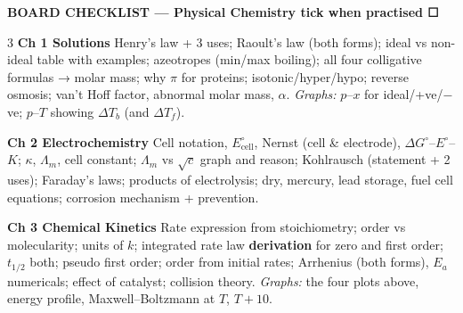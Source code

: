\documentclass[9pt,a4paper]{extarticle}
\begin{document}
\begin{tcolorbox}[enhanced,colback=navy,colframe=navy,arc=2pt,left=6pt,right=6pt,top=2pt,bottom=2pt,before skip=4pt]
\color{white}\sffamily\bfseries\small BOARD CHECKLIST — Physical Chemistry \hfill\footnotesize\mdseries tick when practised ☐
\end{tcolorbox}
\begin{multicols}{3}\raggedcolumns
\scriptsize
\textbf{\textcolor{uI}{Ch 1 Solutions}} Henry's law + 3 uses; Raoult's law (both forms); ideal vs non-ideal table with examples; azeotropes (min/max boiling); all four colligative formulas → molar mass; why $\pi$ for proteins; isotonic/hyper/hypo; reverse osmosis; van't Hoff factor, abnormal molar mass, $\alpha$. \emph{Graphs:} $p$--$x$ for ideal/+ve/$-$ve; $p$--$T$ showing $\Delta T_b$ (and $\Delta T_f$).

\textbf{\textcolor{uII}{Ch 2 Electrochemistry}} Cell notation, $E^\circ_\text{cell}$, Nernst (cell \& electrode), $\Delta G^\circ$--$E^\circ$--$K$; $\kappa$, $\Lambda_m$, cell constant; $\Lambda_m$ vs $\sqrt c$ graph and reason; Kohlrausch (statement + 2 uses); Faraday's laws; products of electrolysis; dry, mercury, lead storage, fuel cell equations; corrosion mechanism + prevention.

\textbf{\textcolor{uIII}{Ch 3 Chemical Kinetics}} Rate expression from stoichiometry; order vs molecularity; units of $k$; integrated rate law \textbf{derivation} for zero and first order; $t_{1/2}$ both; pseudo first order; order from initial rates; Arrhenius (both forms), $E_a$ numericals; effect of catalyst; collision theory. \emph{Graphs:} the four plots above, energy profile, Maxwell--Boltzmann at $T$, $T+10$.
\end{multicols}

\begin{tcolorbox}[enhanced,colback=white,colframe=navy,boxrule=0.8pt,arc=2pt,title={\sffamily\bfseries\footnotesize My notes},colbacktitle=navy,coltitle=white,height fill,before skip=4pt]
\end{tcolorbox}
\end{document}
